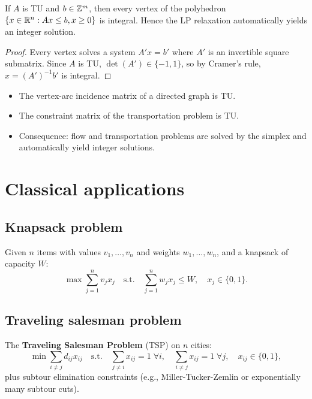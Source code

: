 \begin{theorem}
If $A$ is TU and $b \in \mathbb{Z}^m$, then every vertex of the polyhedron
$\{x \in \mathbb{R}^n : Ax \leq b, x \geq 0\}$ is integral. Hence the LP relaxation
automatically yields an integer solution.
\end{theorem}

\begin{proof}
Every vertex solves a system $A' x = b'$ where $A'$ is an invertible square
submatrix. Since $A$ is TU, $\det(A') \in \{-1, 1\}$, so by Cramer's rule,
$x = (A')^{-1} b'$ is integral.
\end{proof}

\begin{example}
\begin{itemize}
  \item The vertex-arc incidence matrix of a directed graph is TU.
  \item The constraint matrix of the transportation problem is TU.
  \item Consequence: flow and transportation problems are solved by the simplex
        and automatically yield integer solutions.
\end{itemize}
\end{example}

\section{Classical applications}

\subsection{Knapsack problem}

\begin{definition}[0-1 Knapsack]
Given $n$ items with values $v_1, \ldots, v_n$ and weights $w_1, \ldots, w_n$,
and a knapsack of capacity $W$:
\[
  \max \sum_{j=1}^n v_j x_j \quad \text{s.t.} \quad
  \sum_{j=1}^n w_j x_j \leq W, \quad x_j \in \{0, 1\}.
\]
\end{definition}

\subsection{Traveling salesman problem}

\begin{definition}
The \textbf{Traveling Salesman Problem} (TSP) on $n$ cities:
\[
  \min \sum_{i \ne j} d_{ij} x_{ij} \quad \text{s.t.} \quad
  \sum_{j \ne i} x_{ij} = 1 \;\forall i, \quad
  \sum_{i \ne j} x_{ij} = 1 \;\forall j, \quad x_{ij} \in \{0,1\},
\]
plus subtour elimination constraints (e.g., Miller-Tucker-Zemlin or
exponentially many subtour cuts).
\end{definition}

